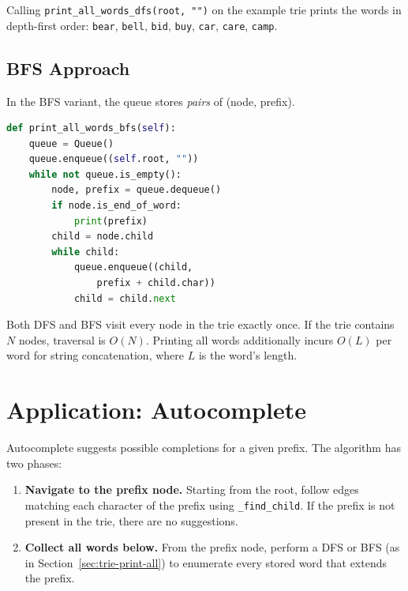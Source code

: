 \documentclass[11pt, a4paper, notitlepage]{report}
\theoremstyle{definition}
\theoremstyle{remark}
\theoremstyle{definition}
\begin{document}
Calling \texttt{print\_all\_words\_dfs(root, "")} on the example trie prints
the words in depth-first order: \texttt{bear}, \texttt{bell}, \texttt{bid},
\texttt{buy}, \texttt{car}, \texttt{care}, \texttt{camp}.

\subsection{BFS Approach}
\label{subsec:trie-print-bfs}

In the BFS variant, the queue stores \emph{pairs} of (node, prefix).

\begin{lstlisting}[language=Python]
def print_all_words_bfs(self):
    queue = Queue()
    queue.enqueue((self.root, ""))
    while not queue.is_empty():
        node, prefix = queue.dequeue()
        if node.is_end_of_word:
            print(prefix)
        child = node.child
        while child:
            queue.enqueue((child,
                prefix + child.char))
            child = child.next
\end{lstlisting}

\begin{keyresult}[title={Key Result: Trie Traversal Complexity}]
Both DFS and BFS visit every node in the trie exactly once.  If the trie
contains $N$ nodes, traversal is $O(N)$.  Printing all words additionally
incurs $O(L)$ per word for string concatenation, where $L$ is the word's
length.
\end{keyresult}

\section{Application: Autocomplete}
\label{sec:trie-autocomplete}

Autocomplete suggests possible completions for a given prefix.  The algorithm
has two phases:

\begin{enumerate}
  \item \textbf{Navigate to the prefix node.}  Starting from the root, follow
        edges matching each character of the prefix using
        \texttt{\_find\_child}.  If the prefix is not present in the trie,
        there are no suggestions.
  \item \textbf{Collect all words below.}  From the prefix node, perform a
        DFS or BFS (as in Section~\ref{sec:trie-print-all}) to enumerate
        every stored word that extends the prefix.
\end{enumerate}
\end{document}
